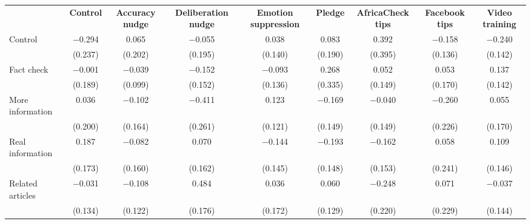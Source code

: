 
\begin{tabular}[t]{lcccccccc}
 & \textbf{Control} & \textbf{Accuracy nudge} & \textbf{Deliberation nudge} & \textbf{Emotion suppression} & \textbf{Pledge} & \textbf{AfricaCheck tips} & \textbf{Facebook tips} & \textbf{Video training}\\ 
 \cmidrule(lr){2-2} \cmidrule(lr){3-3}\cmidrule(lr){4-4}\cmidrule(lr){5-5}\cmidrule(lr){6-6}\cmidrule(lr){7-7}\cmidrule(lr){8-8}\cmidrule(lr){9-9}
Control & \num{-0.294} & \num{0.065} & \num{-0.055} & \num{0.038} & \num{0.083} & \num{0.392} & \num{-0.158} & \num{-0.240}\\
 & (\num{0.237}) & (\num{0.202}) & (\num{0.195}) & (\num{0.140}) & (\num{0.190}) & (\num{0.395}) & (\num{0.136}) & (\num{0.142})\\
Fact check & \num{-0.001} & \num{-0.039} & \num{-0.152} & \num{-0.093} & \num{0.268} & \num{0.052} & \num{0.053} & \num{0.137}\\
 & (\num{0.189}) & (\num{0.099}) & (\num{0.152}) & (\num{0.136}) & (\num{0.335}) & (\num{0.149}) & (\num{0.170}) & (\num{0.142})\\
More information & \num{0.036} & \num{-0.102} & \num{-0.411} & \num{0.123} & \num{-0.169} & \num{-0.040} & \num{-0.260} & \num{0.055}\\
 & (\num{0.200}) & (\num{0.164}) & (\num{0.261}) & (\num{0.121}) & (\num{0.149}) & (\num{0.149}) & (\num{0.226}) & (\num{0.170})\\
Real information & \num{0.187} & \num{-0.082} & \num{0.070} & \num{-0.144} & \num{-0.193} & \num{-0.162} & \num{0.058} & \num{0.109}\\
 & (\num{0.173}) & (\num{0.160}) & (\num{0.162}) & (\num{0.145}) & (\num{0.148}) & (\num{0.153}) & (\num{0.241}) & (\num{0.146})\\
Related articles & \num{-0.031} & \num{-0.108} & \num{0.484} & \num{0.036} & \num{0.060} & \num{-0.248} & \num{0.071} & \num{-0.037}\\
 & (\num{0.134}) & (\num{0.122}) & (\num{0.176}) & (\num{0.172}) & (\num{0.129}) & (\num{0.220}) & (\num{0.229}) & (\num{0.144})\\
\end{tabular}
